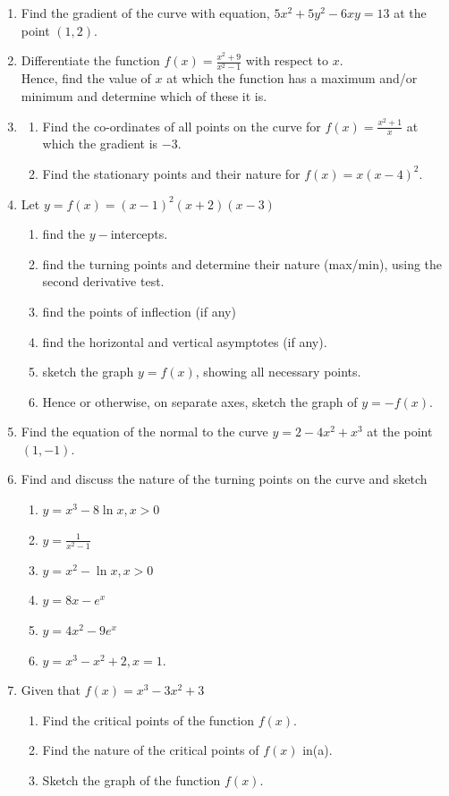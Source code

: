 \documentclass[11pt,a4paper]{article}
\theoremstyle{definition}
\begin{document}
\begin{enumerate}
\item Find the gradient of the curve with equation, $5x^2+5y^2-6xy=13$ at the point $(1,2)$.
\item Differentiate the function $f(x)=\frac{x^2+9}{x^2-1}$ with respect to $x$.\\ Hence, find the value of $x$ at which the function has a maximum and/or minimum and determine which of these it is.
\item
\begin{enumerate}
      \item Find the co-ordinates of all points on the curve for $f(x)=\frac{x^2+1}{x}$ at which the gradient is $-3$.
      \item Find the stationary points and their nature for $f(x)=x(x-4)^2$.
\end{enumerate}
\item Let $y=f(x)=(x-1)^2(x+2)(x-3)$
\begin{enumerate}
       \item find the $y-$intercepts.
       \item find the turning points and determine their nature (max/min), using the second derivative test.
       \item find the points of inflection (if any)
       \item find the horizontal and vertical asymptotes (if any).
       \item sketch the graph $y=f(x)$, showing all necessary points.
       \item Hence or otherwise, on separate axes, sketch the graph of $y=-f(x)$.
\end{enumerate}
\item Find the equation of the normal to the curve $y=2-4x^2+x^3$ at the point $(1,-1)$.
\item Find and discuss the nature of the turning points on the curve and sketch
\begin{enumerate}
      \item $y=x^3-8\ln x, x>0$
      \item $y=\frac{1}{x^2-1}$
      \item $y=x^2-\ln x, x>0$
      \item $y=8x-e^x$
      \item $y=4x^2-9e^x$
      \item $y=x^3-x^2+2, x=1.$
\end{enumerate}
\item Given that $f(x)=x^3-3x^2+3$
\begin{enumerate}
      \item Find the critical points of the function $f(x)$.
      \item Find the nature of the critical points of $f(x)$ in(a).
      \item Sketch the graph of the function $f(x)$.\\
\end{enumerate}
\end{enumerate}
\end{document}
